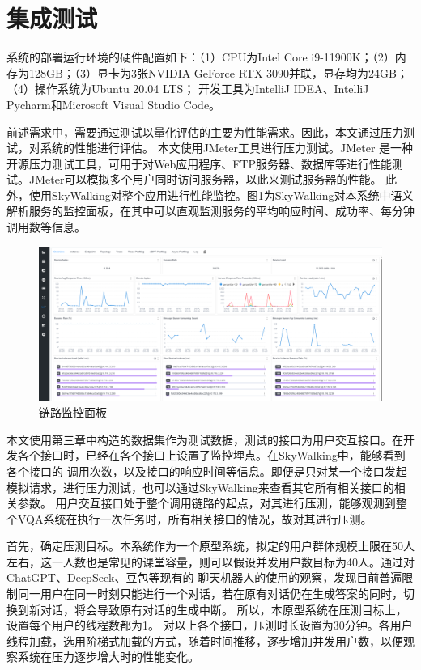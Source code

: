 \section{集成测试}
系统的部署运行环境的硬件配置如下：（1）CPU为Intel Core i9-11900K；（2）内存为128GB；（3）显卡为3张NVIDIA GeForce RTX 3090并联，显存均为24GB；（4）操作系统为Ubuntu 20.04 LTS；
开发工具为IntelliJ IDEA、IntelliJ Pycharm和Microsoft Visual Studio Code。

前述需求中，需要通过测试以量化评估的主要为性能需求。因此，本文通过压力测试，对系统的性能进行评估。
本文使用JMeter工具进行压力测试。JMeter 是一种开源压力测试工具，可用于对Web应用程序、FTP服务器、数据库等进行性能测试。JMeter可以模拟多个用户同时访问服务器，以此来测试服务器的性能。
此外，使用SkyWalking对整个应用进行性能监控。图\ref{fig:SkyWalking}为SkyWalking对本系统中语义解析服务的监控面板，在其中可以直观监测服务的平均响应时间、成功率、每分钟调用数等信息。
\begin{figure}[h]
    \centering
    \includegraphics[width=\textwidth]{figures/SkyWalking.png}
    \caption{链路监控面板}
    \label{fig:SkyWalking}
\end{figure}

本文使用第三章中构造的数据集作为测试数据，测试的接口为用户交互接口。在开发各个接口时，已经在各个接口上设置了监控埋点。在SkyWalking中，能够看到各个接口的
调用次数，以及接口的响应时间等信息。即便是只对某一个接口发起模拟请求，进行压力测试，也可以通过SkyWalking来查看其它所有相关接口的相关参数。
用户交互接口处于整个调用链路的起点，对其进行压测，能够观测到整个VQA系统在执行一次任务时，所有相关接口的情况，故对其进行压测。

首先，确定压测目标。本系统作为一个原型系统，拟定的用户群体规模上限在50人左右，这一人数也是常见的课堂容量，则可以假设并发用户数目标为40人。通过对ChatGPT、DeepSeek、豆包等现有的
聊天机器人的使用的观察，发现目前普遍限制同一用户在同一时刻只能进行一个对话，若在原有对话仍在生成答案的同时，切换到新对话，将会导致原有对话的生成中断。
所以，本原型系统在压测目标上，设置每个用户的线程数都为1。
对以上各个接口，压测时长设置为30分钟。各用户线程加载，选用阶梯式加载的方式，随着时间推移，逐步增加并发用户数，以便观察系统在压力逐步增大时的性能变化。

